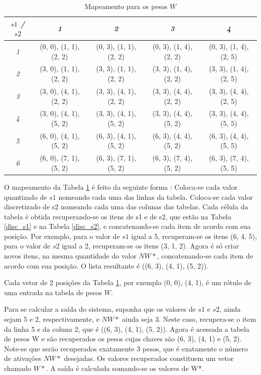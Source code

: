 \begin{table}[ht]
	\centering
	\caption{Mapeamento para os pesos $W$}
	\label{wmap}
	\ABNTEXfontereduzida
	\begin{tabular}{c c c c c}
		\toprule
		\textit{$s1$ / $s2$} & \textit{1}  & \textit{2} & \textit{3} & \textit{4} \\
		\midrule
		\ABNTEXfontereduzida

		\textit{1} & (0, 0), (1, 1), (2, 2) & (0, 3), (1, 1), (2, 2) & (0, 3), (1, 4), (2, 2) & (0, 3), (1, 4), (2, 5) \\
		\textit{2} & (3, 0), (1, 1), (2, 2) & (3, 3), (1, 1), (2, 2) & (3, 3), (1, 4), (2, 2) & (3, 3), (1, 4), (2, 5) \\
		\textit{3} & (3, 0), (4, 1), (2, 2) & (3, 3), (4, 1), (2, 2) & (3, 3), (4, 4), (2, 2) & (3, 3), (4, 4), (2, 5) \\
		\textit{4} & (3, 0), (4, 1), (5, 2) & (3, 3), (4, 1), (5, 2) & (3, 3), (4, 4), (5, 2) & (3, 3), (4, 4), (5, 5) \\
		\textit{5} & (6, 0), (4, 1), (5, 2) & (6, 3), (4, 1), (5, 2) & (6, 3), (4, 4), (5, 2) & (6, 3), (4, 4), (5, 5) \\
		\textit{6} & (6, 0), (7, 1), (5, 2) & (6, 3), (7, 1), (5, 2) & (6, 3), (7, 4), (5, 2) & (6, 3), (7, 4), (5, 5) \\

		\bottomrule
	\end{tabular}
\end{table}
 
O mapeamento da Tabela \ref{wmap} é feito da seguinte forma \cite{Albus1975b}: 
Coloca-se cada valor quantizado de $s1$ nomeando cada uma das linhas da tabela. 
Coloca-se cada valor discretizado de s2 nomeando cada uma das colunas das tabelas. 
Cada célula da tabela é obtida recuperando-se os itens de s1 e de s2, que estão na Tabela \ref{disc_s1} e na Tabela \ref{disc_s2}, e concatenando-se cada item de acordo com sua posição. 
Por exemplo, para o valor de $s1$ igual a 5, recuperam-se os itens (6, 4, 5), para o valor de $s2$ igual a 2, recuperam-se os itens (3, 1, 2). 
Agora é só criar novos itens, na mesma quantidade do valor $NW*$, concatenando-se cada item de acordo com sua posição. O lista resultante é ((6, 3), (4, 1), (5, 2)). 

Cada vetor de 2 posições da Tabela \ref{wmap}, por exemplo (0, 0), (4, 1), é um rótulo de uma entrada na tabela de pesos $W$.

Para se calcular a saída do sistema, suponha que os valores de $s1$ e $s2$, ainda sejam 5 e 2, respectivamente, e $NW*$ ainda seja 3. 
Neste caso, recupera-se o item da linha 5 e da coluna 2, que é ((6, 3), (4, 1), (5, 2)). 
Agora é acessada a tabela de pesos W e são recuperados os pesos cujas chaves são (6, 3), (4, 1) e (5, 2). 
Note-se que serão recuperados exatamente 3 pesos, que é exatamente o número de ativações $NW*$ desejadas. 
Os valores recuperados constituem um vetor chamado $W*$. A saída é calculada somando-se os valores de W*.

